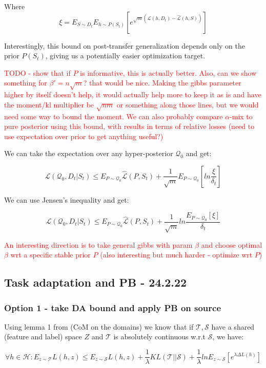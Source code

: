 \documentclass[letterpaper]{article}
\theoremstyle{definition}
\begin{document}
Where $$\xi=E_{S\sim D_t}E_{h\sim P(S_t)}\left [e^{\sqrt{m}(\mathcal{L}(h, D_t)-\hat{\mathcal{L}}(h, S))} \right ]$$

Interestingly, this bound on post-transfer generalization depends only on the prior $P(S_t)$, giving us a potentially easier optimization target.

\textcolor{red}{TODO - show that if $P$ is informative, this is actually better. Also, can we show something for $\beta'=n\sqrt{m}$? that would be nice. Making the gibbs parameter higher by itself doesn't help, it would actually help more to keep it as is and have the moment/kl multiplier be $\sqrt{nm}$ or something along those lines, but we would need some way to bound the moment.
	We can also probably compare $\alpha$-mix to pure posterior using this bound, with results in terms of relative losses (need to use expectation over prior to get anything useful?)}

We can take the expectation over any hyper-posterior $\mathcal{Q}_0$ and get:

$$\mathcal{L}(\mathcal{Q}_0, D_t|S_t) \leq E_{P\sim \mathcal{Q}_0}\hat{\mathcal{L}}(P, S_t) + \frac{1}{\sqrt{m}}E_{P\sim \mathcal{Q}_0}\left [ln\frac{\xi}{\delta_t}\right ]$$

We can use Jensen's inequality and get:

$$\mathcal{L}(\mathcal{Q}_0, D_t|S_t) \leq E_{P\sim \mathcal{Q}_0}\hat{\mathcal{L}}(P, S_t) + \frac{1}{\sqrt{m}}ln\frac{E_{P\sim \mathcal{Q}_0}\left [\xi\right ]}{\delta_t}$$

\textcolor{red}{An interesting direction is to take general gibbs with param $\beta$ and choose optimal $\beta$ wrt a specific stable prior $P$ (also interesting but much harder - optimize wrt $P$)}

\subsection{Task adaptation and PB - 24.2.22} \label{subsec:pb-adapt}

\subsubsection{Option 1 - take DA bound and apply PB on source}
Using lemma 1 from \cite{Shui2020} (CoM on the domains) we know that if $\mathcal{T}, \mathcal{S}$ have a shared (feature and label) space $Z$ and $\mathcal{T}$ is absolutely continuous w.r.t $\mathcal{S}$, we have:

$$\forall h\in \mathcal{H}: E_{z\sim \mathcal{T}}L(h, z) \leq E_{z\sim \mathcal{S}}L(h, z) + \frac{1}{\lambda}KL(\mathcal{T}||\mathcal{S})+\frac{1}{\lambda}ln E_{z\sim \mathcal{S}}\left [e^{\lambda \Delta L(h)}\right ]  $$
\end{document}
